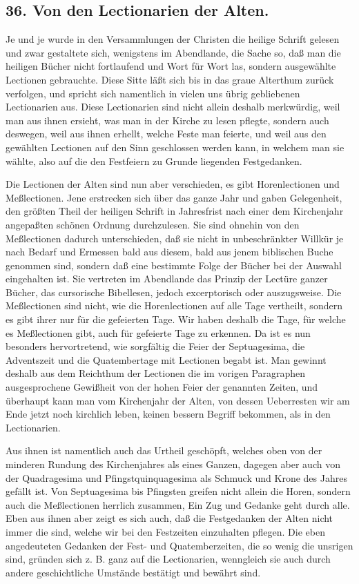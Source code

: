 \subsection*{36. Von den Lectionarien der Alten.}

Je und je wurde in den Versammlungen der Christen die heilige Schrift gelesen und zwar gestaltete sich, wenigstens im Abendlande, die Sache so, daß man die heiligen Bücher nicht fortlaufend und Wort für Wort las, sondern ausgewählte Lectionen gebrauchte. Diese Sitte läßt sich bis in das graue Alterthum zurück verfolgen, und spricht sich namentlich in vielen uns übrig gebliebenen Lectionarien aus. Diese Lectionarien sind nicht allein deshalb merkwürdig, weil man aus ihnen ersieht, was man in der Kirche zu lesen pflegte, sondern auch deswegen, weil aus ihnen erhellt, welche Feste man feierte, und weil aus den gewählten Lectionen auf den Sinn geschlossen werden kann, in welchem man sie wählte, also auf die den Festfeiern zu Grunde liegenden Festgedanken.

Die Lectionen der Alten sind nun aber verschieden, es gibt Horenlectionen und Meßlectionen. Jene erstrecken sich über das ganze Jahr und gaben Gelegenheit, den größten Theil der heiligen Schrift in Jahresfrist nach einer dem Kirchenjahr angepaßten schönen Ordnung durchzulesen. Sie sind ohnehin von den Meßlectionen dadurch unterschieden, daß sie nicht in unbeschränkter Willkür je nach Bedarf und Ermessen bald aus diesem, bald aus jenem biblischen Buche genommen sind, sondern daß eine bestimmte Folge der Bücher bei der Auswahl eingehalten ist. Sie vertreten im Abendlande das Prinzip der Lectüre ganzer Bücher, das cursorische Bibellesen, jedoch excerptorisch oder auszugsweise. Die Meßlectionen sind
nicht, wie die Horenlectionen auf alle Tage vertheilt, sondern es gibt ihrer nur für die gefeierten Tage. Wir haben deshalb die Tage, für welche es Meßlectionen gibt, auch für gefeierte Tage zu erkennen. Da ist es nun besonders hervortretend, wie sorgfältig die Feier der Septuagesima, die Adventszeit und die Quatembertage mit Lectionen begabt ist. Man gewinnt deshalb aus dem Reichthum der Lectionen die im vorigen Paragraphen ausgesprochene Gewißheit von der hohen Feier der genannten Zeiten, und überhaupt kann man vom Kirchenjahr der Alten, von dessen Ueberresten wir am Ende jetzt noch kirchlich leben, keinen bessern Begriff bekommen, als in den Lectionarien.

Aus ihnen ist namentlich auch das Urtheil geschöpft, welches oben von der minderen Rundung des Kirchenjahres als eines Ganzen, dagegen aber auch von der Quadragesima und Pfingstquinquagesima als Schmuck und Krone des Jahres gefällt ist. Von Septuagesima bis Pfingsten greifen nicht allein die Horen, sondern auch die Meßlectionen herrlich zusammen, Ein Zug und Gedanke geht durch alle. Eben aus ihnen aber zeigt es sich auch, daß die Festgedanken der Alten nicht immer die sind, welche wir bei den Festzeiten einzuhalten pflegen. Die eben angedeuteten Gedanken der Fest- und Quatemberzeiten, die so wenig die unsrigen sind, gründen sich z. B. ganz auf die Lectionarien, wenngleich sie auch durch andere geschichtliche Umstände bestätigt und bewährt sind.

